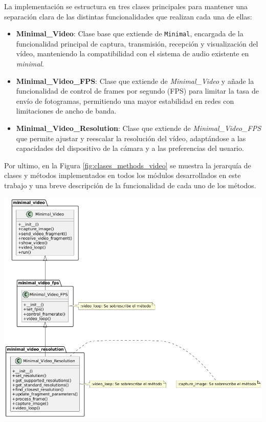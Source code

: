 La implementación se estructura en tres clases principales para mantener una separación clara de las distintas funcionalidades que realizan cada una de ellas:

\begin{itemize}
    \item \textbf{Minimal\_Video}: Clase base que extiende de \texttt{Minimal}, encargada de la funcionalidad principal de captura, transmisión, recepción y visualización del vídeo, manteniendo la compatibilidad con el sistema de audio existente en \textit{minimal}.
    \item \textbf{Minimal\_Video\_FPS}: Clase que extiende de \textit{Minimal\_Video} y añade la funcionalidad de control de frames por segundo (FPS) para limitar la tasa de envío de fotogramas, permitiendo una mayor estabilidad en redes con limitaciones de ancho de banda.
    \item \textbf{Minimal\_Video\_Resolution}: Clase que extiende de \textit{Minimal\_Video\_FPS} que permite ajustar y reescalar la resolución del vídeo, adaptándose a las capacidades del dispositivo de la cámara y a las preferencias del usuario.
\end{itemize}
\vspace{\baselineskip}

Por ultimo, en la Figura \ref{fig:clases_methods_video} se muestra la jerarquía de clases y métodos implementados en todos los módulos desarrollados en este trabajo y una breve descripción de la funcionalidad de cada uno de los métodos.
\begin{center}
    \includegraphics[width = 1\textwidth]{images/uml.png}
    \label{fig:clases_methods_video}
\end{center}

